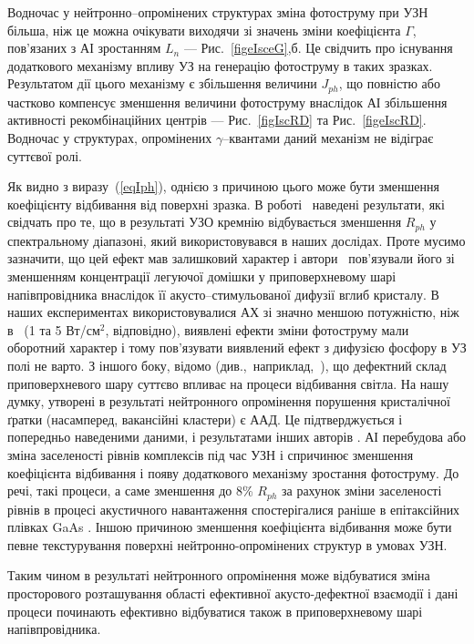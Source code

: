 Водночас у нейтронно--опромінених структурах зміна фотоструму при УЗН більша,
ніж це можна очікувати виходячи зі значень зміни коефіцієнта $\Gamma$, пов’язаних з АІ зростанням $L_n$ --- Рис.~\ref{figeIsceG},б.
Це свідчить про існування додаткового механізму впливу УЗ на генерацію фотоструму в таких зразках.
Результатом дії цього механізму є збільшення величини $J_{ph}$, що повністю або частково компенсує
зменшення величини фотоструму внаслідок АІ збільшення активності рекомбінаційних центрів --- Рис.~\ref{figIscRD} та Рис.~\ref{figeIscRD}.
Водночас у структурах, опромінених $\gamma$--квантами даний механізм не відіграє суттєвої ролі.


Як видно з виразу~(\ref{eqIph}), однією з причиною цього може бути зменшення коефіцієнту відбивання від поверхні зразка.
В роботі~\cite{Zaver} наведені результати, які свідчать про те, що в результаті УЗО кремнію відбувається
зменшення $R_{ph}$ у спектральному
діапазоні, який використовувався в наших дослідах.
Проте мусимо зазначити, що цей ефект мав залишковий характер і
автори~\cite{Zaver} пов’язували його зі зменшенням концентрації
легуючої домішки у приповерхневому шарі напівпровідника внаслідок
її акусто--стимульованої дифузії вглиб кристалу.
В наших експериментах використовувалися АХ зі значно меншою потужністю, ніж
в~\cite{Zaver} (1 та 5 Вт/см$^2$, відповідно),  виявлені ефекти зміни фотоструму мали оборотний характер
і тому пов'язувати виявлений ефект з дифузією фосфору в УЗ полі не варто.
З іншого боку, відомо (див.,~наприклад,~\cite{Kizel}), що дефектний склад
приповерхневого шару суттєво впливає на процеси відбивання світла.
На нашу думку, утворені в результаті нейтронного опромінення порушення кристалічної ґратки
(насамперед, вакансійні кластери) є ААД.
Це підтверджується і попередньо наведеними даними, і результатами інших авторів \cite{YOlikh2006TPLr}.
АІ перебудова або зміна заселеності рівнів комплексів під час УЗН і спричинює зменшення коефіцієнта відбивання
і появу додаткового механізму зростання фотоструму.
До речі, такі процеси, а саме зменшення до 8\% $R_{ph}$ за рахунок зміни заселеності рівнів в
процесі акустичного навантаження спостерігалися раніше в
епітаксійних плівках GaAs \cite{Korotch}.
Іншою причиною зменшення
коефіцієнта відбивання може бути певне текстурування поверхні нейтронно-опромінених
структур в умовах УЗН.

Таким чином в результаті нейтронного опромінення може відбуватися
зміна просторового розташування області ефективної акусто-дефектної
взаємодії і дані процеси починають ефективно відбуватися також в
приповерхневому шарі напівпровідника.



